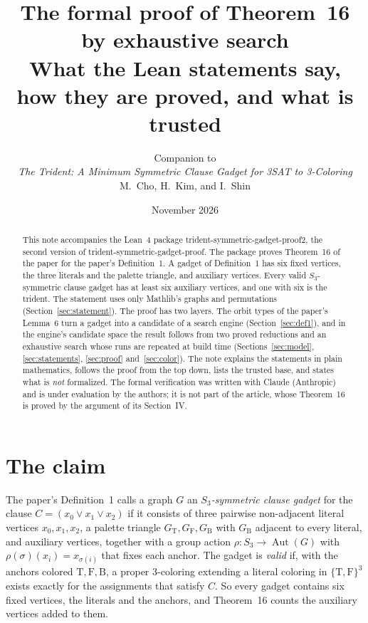 \documentclass[11pt,a4paper]{article}
\title{The formal proof of Theorem~16 by exhaustive search\\[2pt]
\large What the Lean statements say, how they are proved, and what is trusted}
\author{Companion to\\ \emph{The Trident: A Minimum Symmetric Clause Gadget for 3SAT to 3-Coloring}\\
M.~Cho, H.~Kim, and I.~Shin}
\date{November 2026}
\newcommand{\leanus}{\textunderscore\allowbreak}
\newcommand{\lean}[1]{{\ttfamily\let\_\leanus #1}}
\newcommand{\GT}{G_{\mathrm{T}}}
\newcommand{\GF}{G_{\mathrm{F}}}
\newcommand{\GB}{G_{\mathrm{B}}}
\newcommand{\T}{\mathrm{T}}
\newcommand{\F}{\mathrm{F}}
\newcommand{\B}{\mathrm{B}}
\theoremstyle{definition}
\begin{document}
\maketitle

\begin{abstract}
\noindent
This note accompanies the Lean~4 package
\lean{trident-symmetric-gadget-proof2}, the second version of
\lean{trident-symmetric-gadget-proof}. The package proves Theorem~16
of the paper for the paper's Definition~1. A gadget of Definition~1 has six
fixed vertices, the three literals and the palette triangle, and auxiliary
vertices. Every valid $S_3$-symmetric clause gadget has at least six
auxiliary vertices, and one with six is the trident. The statement uses only
Mathlib's graphs and permutations (Section~\ref{sec:statement}). The proof has two layers. The
orbit types of the paper's Lemma~6 turn a gadget into a candidate of a
search engine (Section~\ref{sec:def1}), and in the engine's candidate space
the result
follows from two proved reductions and an exhaustive search whose runs are
repeated at build time (Sections~\ref{sec:model}, \ref{sec:statements},
\ref{sec:proof} and~\ref{sec:color}). The note
explains the statements in plain mathematics, follows the proof from the top
down, lists the trusted base, and states what is \emph{not} formalized.
The formal verification was written with Claude (Anthropic) and is under
evaluation by the authors; it is not part of the article, whose Theorem~16 is
proved by the argument of its Section~IV.
\end{abstract}

\tableofcontents

\section{The claim}\label{sec:claim}

The paper's Definition~1 calls a graph $G$ an \emph{$S_3$-symmetric clause
gadget} for the clause $C=(x_0\lor x_1\lor x_2)$ if it consists of three
pairwise non-adjacent literal vertices $x_0,x_1,x_2$, a palette triangle
$\GT,\GF,\GB$ with $\GB$ adjacent to every literal, and auxiliary vertices,
together with a group action $\rho:S_3\to\operatorname{Aut}(G)$ with
$\rho(\sigma)(x_i)=x_{\sigma(i)}$ that fixes each anchor. The gadget is
\emph{valid} if, with the anchors colored $\T,\F,\B$, a proper 3-coloring
extending a literal coloring in $\{\T,\F\}^3$ exists exactly for the
assignments that satisfy $C$. So every gadget contains six fixed vertices,
the literals and the anchors, and Theorem~16 counts the auxiliary vertices
added to them.
\end{document}
